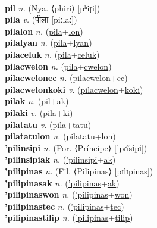  \label{piasakiles} \\
\textbf{pil} \textit{n.} (Nya. ⟨phiri⟩ [pʰiɽi])
 \label{pil} \\
\textbf{pila} \textit{v.} ({\devanagari{}पीला} [piːlaː])
 \label{pila} \\
\textbf{pilalon} \textit{n.} (\hyperref[pila]{pila}+\hyperref[lon]{lon})
 \label{pilalon} \\
\textbf{pilalyan} \textit{n.} (\hyperref[pila]{pila}+\hyperref[lyan]{lyan})
 \label{pilalyan} \\
\textbf{pilaceluk} \textit{n.} (\hyperref[pila]{pila}+\hyperref[celuk]{celuk})
 \label{pilaceluk} \\
\textbf{pilacwelon} \textit{n.} (\hyperref[pila]{pila}+\hyperref[cwelon]{cwelon})
 \label{pilacwelon} \\
\textbf{pilacwelonec} \textit{n.} (\hyperref[pilacwelon]{pilacwelon}+\hyperref[ec]{ec})
 \label{pilacwelonec} \\
\textbf{pilacwelonkoki} \textit{v.} (\hyperref[pilacwelon]{pilacwelon}+\hyperref[koki]{koki})
 \label{pilacwelonkoki} \\
\textbf{pilak} \textit{n.} (\hyperref[pil]{pil}+\hyperref[ak]{ak})
 \label{pilak} \\
\textbf{pilaki} \textit{v.} (\hyperref[pila]{pila}+\hyperref[ki]{ki})
 \label{pilaki} \\
\textbf{pilatatu} \textit{v.} (\hyperref[pila]{pila}+\hyperref[tatu]{tatu})
 \label{pilatatu} \\
\textbf{pilatatulon} \textit{n.} (\hyperref[pilatatu]{pilatatu}+\hyperref[lon]{lon})
 \label{pilatatulon} \\
\textbf{'pilinsipi} \textit{n.} (Por. ⟨Príncipe⟩ [ˈpɾĩsɨpɨ])
 \label{'pilinsipi} \\
\textbf{'pilinsipiak} \textit{n.} (\hyperref['pilinsipi]{'pilinsipi}+\hyperref[ak]{ak})
 \label{'pilinsipiak} \\
\textbf{'pilipinas} \textit{n.} (Fil. ⟨Pilipinas⟩ [pɪlɪpinas])
 \label{'pilipinas} \\
\textbf{'pilipinasak} \textit{n.} (\hyperref['pilipinas]{'pilipinas}+\hyperref[ak]{ak})
 \label{'pilipinasak} \\
\textbf{'pilipinaswon} \textit{n.} (\hyperref['pilipinas]{'pilipinas}+\hyperref[won]{won})
 \label{'pilipinaswon} \\
\textbf{'pilipinastec} \textit{n.} (\hyperref['pilipinas]{'pilipinas}+\hyperref[tec]{tec})
 \label{'pilipinastec} \\
\textbf{'pilipinastilip} \textit{n.} (\hyperref['pilipinas]{'pilipinas}+\hyperref[tilip]{tilip})
